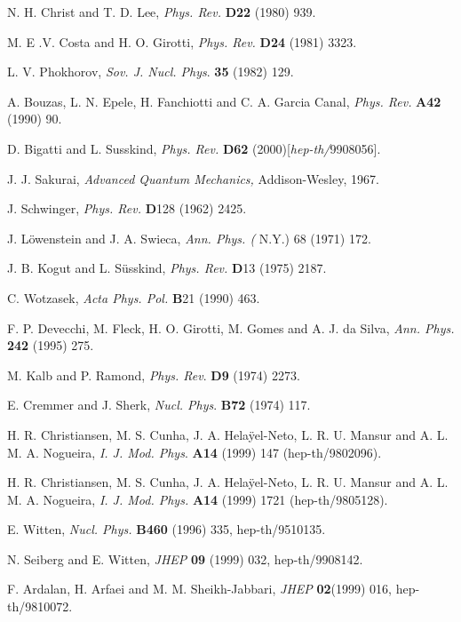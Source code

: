 \documentclass[a4paper,thmsa,12pt]{report}
\begin{document}
\begin{thebibliography}{99}
  N. H. Christ and T. D. Lee, \textit{Phys. Rev. }%
\textbf{D22 }(1980) 939.

  M. E .V. Costa and H. O. Girotti, \textit{Phys.
Rev. }\textbf{D24} (1981) 3323.

  L. V. Phokhorov, \textit{Sov. J. Nucl. Phys}. \textbf{%
35 }(1982) 129.

  A. Bouzas, L. N. Epele, H. Fanchiotti and C. A. Garcia
Canal, \textit{Phys. Rev. }\textbf{A42 }(1990) 90.

  D. Bigatti and L. Susskind, \textit{Phys. Rev.} \textbf{%
D62} (2000)[\textit{hep-th/}9908056].

  J. J. Sakurai, \textit{Advanced Quantum Mechanics, }%
Addison-Wesley, 1967.

  J. Schwinger, \textit{Phys. Rev. }\textbf{D}128 (1962)
2425.

  J. L\"{o}wenstein and J. A. Swieca, \textit{Ann. Phys. (}%
N.Y.) 68 (1971) 172.

  J. B. Kogut and L. S\"{u}sskind, \textit{Phys. Rev. }%
\textbf{D}13 (1975) 2187.

  C. Wotzasek, \textit{Acta Phys. Pol. }\textbf{B}21 (1990)
463.

  F. P. Devecchi, M. Fleck, H. O. Girotti, M. Gomes and A.
J. da Silva, \textit{Ann. Phys. }\textbf{242 }(1995) 275.

  M. Kalb and P. Ramond, \textit{Phys. Rev}. \textbf{D9 }(1974)
2273.

  E. Cremmer and J. Sherk, \textit{Nucl. Phys}. \textbf{B72 }%
(1974) 117.

  H. R. Christiansen, M. S. Cunha, J. A. Hela\"{y}el-Neto, L.
R. U. Mansur and A. L. M. A. Nogueira, \textit{I. J. Mod. Phys}. \textbf{A14}
(1999) 147 (hep-th/9802096).

  H. R. Christiansen, M. S. Cunha, J. A. Hela\"{y}el-Neto, L.
R. U. Mansur and A. L. M. A. Nogueira, \textit{I. J. Mod. Phys.} \textbf{A14 
}(1999) 1721 (hep-th/9805128).

  E. Witten, \textit{Nucl. Phys.} \textbf{B460} (1996) 335,
hep-th/9510135.

  N. Seiberg and E. Witten, \textit{JHEP} \textbf{09} 
(1999) 032, hep-th/9908142.

  F. Ardalan, H. Arfaei and M. M. Sheikh-Jabbari, \textit{%
JHEP} \textbf{02}(1999) 016, hep-th/9810072.


\end{thebibliography}
\end{document}
